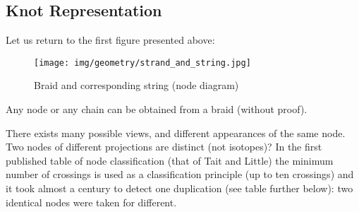 {	\subsection{Knot Representation}
	Let us return to the first figure presented above:
	\begin{figure}[H]
		\centering
		\texttt{[image: img/geometry/strand\_and\_string.jpg]}
		\caption{Braid and corresponding string (node diagram)}
	\end{figure}
	\begin{tcolorbox}[title=Remark,colframe=black,arc=10pt]
	Any node or any chain can be obtained from a braid (without proof).
	\end{tcolorbox}
	There exists many possible views, and different appearances of the same node. Two nodes of different projections are distinct (not isotopes)? In the first published table of node classification (that of Tait and Little) the minimum number of crossings is used as a classification principle (up to ten crossings) and it took almost a century to detect one duplication (see table further below): two identical nodes were taken for different.
	
}
